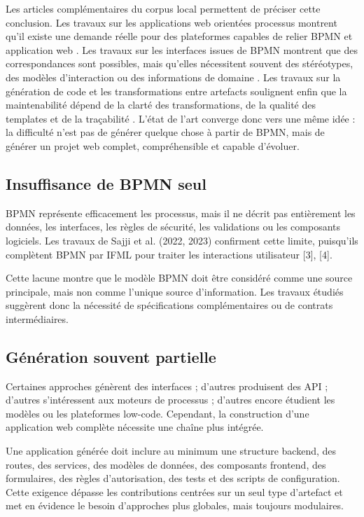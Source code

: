Les articles complémentaires du corpus local permettent de préciser cette conclusion. Les travaux sur les applications web orientées processus montrent qu'il existe une demande réelle pour des plateformes capables de relier BPMN et application web \cite{neto2022,uyanik2023}. Les travaux sur les interfaces issues de BPMN montrent que des correspondances sont possibles, mais qu'elles nécessitent souvent des stéréotypes, des modèles d'interaction ou des informations de domaine \cite{diaz2018,laaz2020,sajji2023}. Les travaux sur la génération de code et les transformations entre artefacts soulignent enfin que la maintenabilité dépend de la clarté des transformations, de la qualité des templates et de la traçabilité \cite{syriani2018,siahaan2024}. L'état de l'art converge donc vers une même idée : la difficulté n'est pas de générer quelque chose à partir de BPMN, mais de générer un projet web complet, compréhensible et capable d'évoluer.


\subsection{Insuffisance de BPMN seul}
BPMN représente efficacement les processus, mais il ne décrit pas entièrement les données, les interfaces, les règles de sécurité, les validations ou les composants logiciels. Les travaux de Sajji et al. (2022, 2023) confirment cette limite, puisqu'ils complètent BPMN par IFML pour traiter les interactions utilisateur [3], [4].

Cette lacune montre que le modèle BPMN doit être considéré comme une source principale, mais non comme l'unique source d'information. Les travaux étudiés suggèrent donc la nécessité de spécifications complémentaires ou de contrats intermédiaires.

\subsection{Génération souvent partielle}

Certaines approches génèrent des interfaces ; d'autres produisent des API ; d'autres s'intéressent aux moteurs de processus ; d'autres encore étudient les modèles ou les plateformes low-code. Cependant, la construction d'une application web complète nécessite une chaîne plus intégrée.

Une application générée doit inclure au minimum une structure backend, des routes, des services, des modèles de données, des composants frontend, des formulaires, des règles d'autorisation, des tests et des scripts de configuration. Cette exigence dépasse les contributions centrées sur un seul type d'artefact et met en évidence le besoin d'approches plus globales, mais toujours modulaires.

